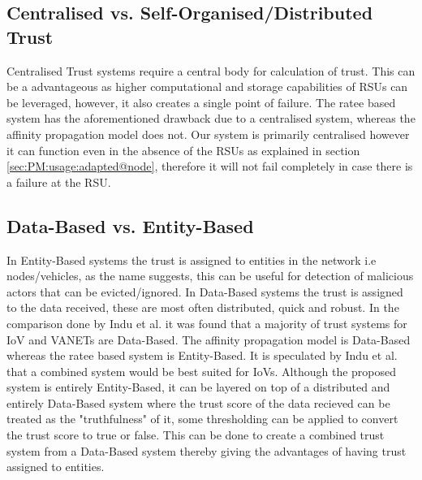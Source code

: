 \documentclass[journal]{IEEEtran}
\begin{document}
\subsection{Centralised vs. Self-Organised/Distributed Trust}
Centralised Trust systems require a central body for calculation of trust. This can be a advantageous as higher computational and storage capabilities of RSUs can be leveraged, however, it also creates a single point of failure. %
The ratee based system has the aforementioned drawback due to a centralised system, whereas the affinity propagation model does not. Our system is primarily centralised however it can function even in the absence of the RSUs as explained in section \ref{sec:PM:usage:adapted@node}, therefore it will not fail completely in case there is a failure at the RSU.
\subsection{Data-Based vs. Entity-Based}
In Entity-Based systems the trust is assigned to entities in the network i.e nodes/vehicles, as the name suggests, this can be useful for detection of malicious actors that can be evicted/ignored.
In Data-Based systems the trust is assigned to the data received, these are most often distributed, quick and robust.
In the comparison done by Indu et al.\cite{c:compareTrust} it was found that a majority of trust systems for IoV and VANETs are Data-Based. The affinity propagation model is Data-Based whereas the ratee based system is Entity-Based. It is speculated by Indu et al.\cite{c:compareTrust} that a combined system would be best suited for IoVs. Although the proposed system is entirely Entity-Based, it can be layered on top of a distributed and entirely Data-Based system where the trust score of the data recieved can be treated as the "truthfulness" of it, some thresholding can be applied to convert the trust score to true or false. This can be done to create a combined trust system from a Data-Based system thereby giving the advantages of having trust assigned to entities.
 
\end{document}
